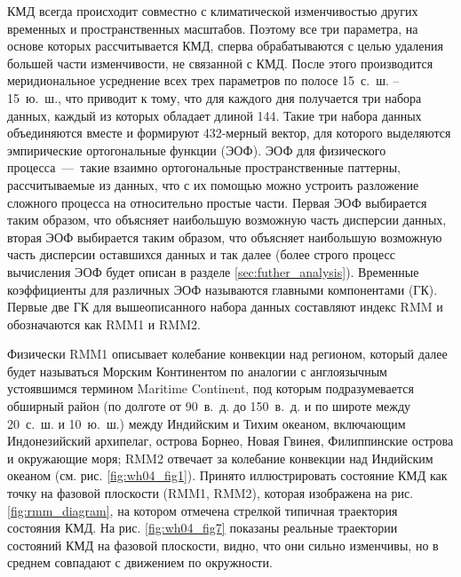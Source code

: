 КМД всегда происходит совместно с климатической изменчивостью других временных и пространственных масштабов. Поэтому все три параметра, на основе которых рассчитывается КМД, сперва обрабатываются с целью удаления большей части изменчивости, не связанной с КМД. После этого производится меридиональное усреднение всех трех параметров по полосе 15\textdegree~с.~ш. -- 15\textdegree~ю.~ш., что приводит к тому, что для каждого дня получается три набора данных, каждый из которых обладает длиной 144. Такие три набора данных объединяются вместе и формируют 432-мерный вектор, для которого выделяются эмпирические ортогональные функции (ЭОФ). ЭОФ для физического процесса~---~такие взаимно ортогональные пространственные паттерны, рассчитываемые из данных, что с их помощью можно устроить разложение сложного процесса на относительно простые части. Первая ЭОФ выбирается таким образом, что объясняет наибольшую возможную часть дисперсии данных, вторая ЭОФ выбирается таким образом, что объясняет наибольшую возможную часть дисперсии оставшихся данных и так далее \cite[Гл. 6]{Zhang_et_al_2020} (более строго процесс вычисления ЭОФ будет описан в разделе \ref{sec:futher_analysis}). Временные коэффициенты для различных ЭОФ называются главными компонентами (ГК). Первые две ГК для вышеописанного набора данных составляют индекс RMM и обозначаются как RMM1 и RMM2.

Физически RMM1 описывает колебание конвекции над регионом, который далее будет называться Морским Континентом по аналогии с англоязычным устоявшимся термином Ma\-ri\-time Continent, под которым подразумевается обширный район (по долготе от 90\textdegree~в.~д. до 150\textdegree~в.~д. и по широте между 20\textdegree~с.~ш. и 10\textdegree~ю.~ш.) между Индийским и Тихим океаном, включающим Индонезийский архипелаг, острова Борнео, Новая Гвинея, Филиппинские острова и окружающие моря; RMM2 отвечает за колебание конвекции над Индийским океаном (см. рис. \ref{fig:wh04_fig1}). Принято иллюстрировать состояние КМД как точку на фазовой плоскости (RMM1, RMM2), которая изображена на рис. \ref{fig:rmm_diagram}, на котором отмечена стрелкой типичная траектория состояния КМД. На рис. \ref{fig:wh04_fig7} показаны реальные траектории состояний КМД на фазовой плоскости, видно, что они сильно изменчивы, но в среднем совпадают с движением по окружности.

